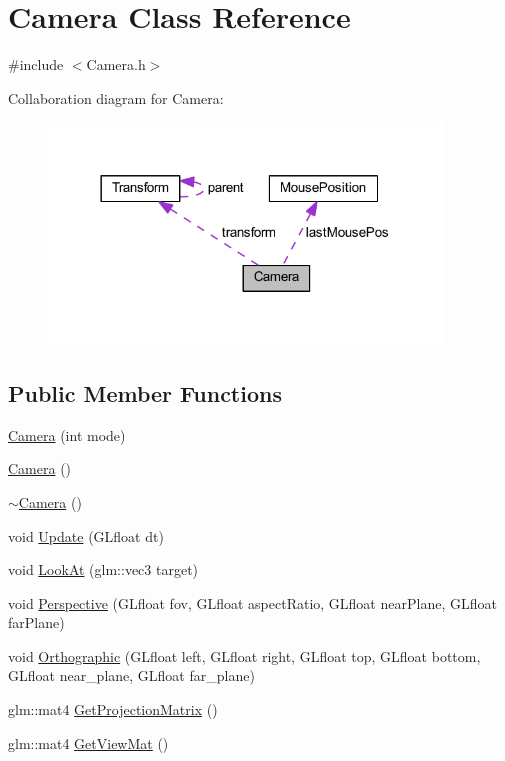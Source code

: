\hypertarget{class_camera}{}\section{Camera Class Reference}
\label{class_camera}


{\ttfamily \#include $<$Camera.\+h$>$}



Collaboration diagram for Camera\+:\nopagebreak
\begin{figure}[H]
\begin{center}
\leavevmode
\includegraphics[width=297pt]{class_camera__coll__graph}
\end{center}
\end{figure}
\subsection*{Public Member Functions}
\begin{DoxyCompactItemize}
\item 
\mbox{\hyperlink{class_camera_a706e41a11eee92cd3f597386ae860885}{Camera}} (int mode)
\item 
\mbox{\hyperlink{class_camera_a01f94c3543f56ede7af49dc778f19331}{Camera}} ()
\item 
\mbox{\hyperlink{class_camera_ad1897942d0ccf91052386388a497349f}{$\sim$\+Camera}} ()
\item 
void \mbox{\hyperlink{class_camera_ac8e78ac212afde90f72d59b3795474d0}{Update}} (G\+Lfloat dt)
\item 
void \mbox{\hyperlink{class_camera_a657181de0da2b330865d005a3e08cc9f}{Look\+At}} (glm\+::vec3 target)
\item 
void \mbox{\hyperlink{class_camera_a61d3c3da4bab7c69c7f24c3f37abe1e5}{Perspective}} (G\+Lfloat fov, G\+Lfloat aspect\+Ratio, G\+Lfloat near\+Plane, G\+Lfloat far\+Plane)
\item 
void \mbox{\hyperlink{class_camera_ad434a557e137d9c24369a3737f857736}{Orthographic}} (G\+Lfloat left, G\+Lfloat right, G\+Lfloat top, G\+Lfloat bottom, G\+Lfloat near\+\_\+plane, G\+Lfloat far\+\_\+plane)
\item 
glm\+::mat4 \mbox{\hyperlink{class_camera_ab0a4bf5a65d45f25529e3cffda1c361b}{Get\+Projection\+Matrix}} ()
\item 
glm\+::mat4 \mbox{\hyperlink{class_camera_a06b3f8e75270f4f2415f8591a315f231}{Get\+View\+Mat}} ()
\end{DoxyCompactItemize}
